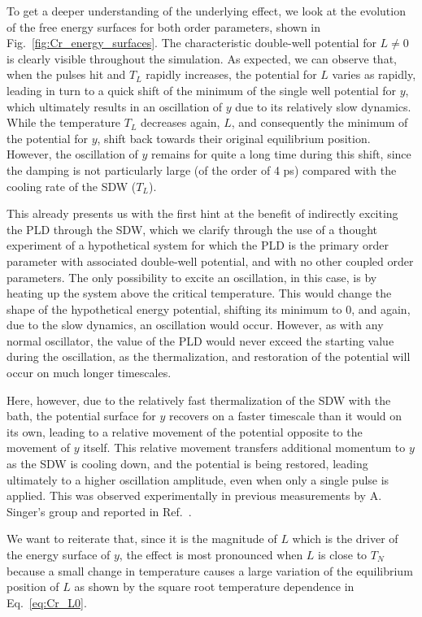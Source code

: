 To get a deeper understanding of the underlying effect, we look at the evolution of the free energy surfaces for both order parameters, shown in Fig.~\ref{fig:Cr_energy_surfaces}.
The characteristic double-well potential for $L\neq0$  is clearly visible throughout the simulation.
As expected, we can observe that, when the pulses hit and $T_L$ rapidly increases, the potential for $L$ varies as rapidly, leading in turn to a quick shift of the minimum of the single well potential for $y$, which ultimately results in an oscillation of $y$ due to its relatively slow dynamics.
While the temperature $T_L$ decreases again, $L$, and consequently the minimum of the potential for $y$, shift back towards their original equilibrium position.
However, the oscillation of $y$ remains for quite a long time during this shift, since the damping is not particularly large (of the order of 4 ps) compared with the cooling rate of the SDW ($T_L$).

This already presents us with the first hint at the benefit of indirectly exciting the PLD through the SDW, which we clarify through the use of a thought experiment of a hypothetical system for which the PLD is the primary order parameter with associated double-well potential, and with no other coupled order parameters.
The only possibility to excite an oscillation, in this case, is by heating up the system above the critical temperature.
This would change the shape of the hypothetical energy potential, shifting its minimum to 0, and again, due to the slow dynamics, an oscillation would occur.
However, as with any normal oscillator, the value of the PLD would never exceed the starting value during the oscillation, as the thermalization, and restoration of the potential will occur on much longer timescales.

Here, however, due to the relatively fast thermalization of the SDW with the bath, the potential surface for $y$ recovers on a faster timescale than it would on its own, leading to a relative movement of the potential opposite to the movement of $y$ itself.
This relative movement transfers additional momentum to $y$ as the SDW is cooling down, and the potential is being restored, leading ultimately to a higher oscillation amplitude, even when only a single pulse is applied.
This was observed experimentally in previous measurements by A. Singer's group and reported in Ref.~\cite{Singer2015prl}. 

We want to reiterate that, since it is the magnitude of $L$ which is the driver of the energy surface of $y$, the effect is most pronounced when $L$ is close to $T_N$ because a small change in temperature causes a large variation of the equilibrium position of $L$ as shown by the square root temperature dependence in Eq.~\eqref{eq:Cr_L0}.    


